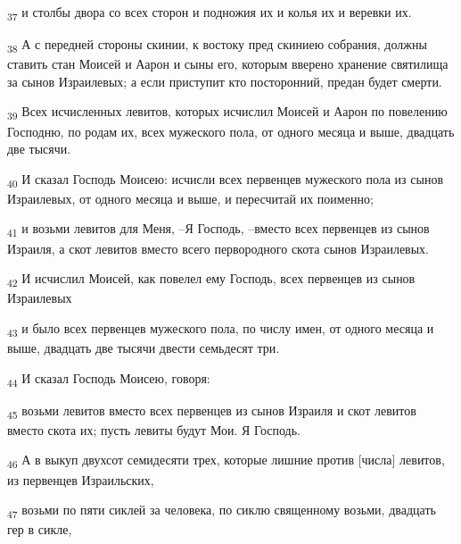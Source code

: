 \begin{tcolorbox}
\textsubscript{37} и столбы двора со всех сторон и подножия их и колья их и веревки их.
\end{tcolorbox}
\begin{tcolorbox}
\textsubscript{38} А с передней стороны скинии, к востоку пред скиниею собрания, должны ставить стан Моисей и Аарон и сыны его, которым вверено хранение святилища за сынов Израилевых; а если приступит кто посторонний, предан будет смерти.
\end{tcolorbox}
\begin{tcolorbox}
\textsubscript{39} Всех исчисленных левитов, которых исчислил Моисей и Аарон по повелению Господню, по родам их, всех мужеского пола, от одного месяца и выше, двадцать две тысячи.
\end{tcolorbox}
\begin{tcolorbox}
\textsubscript{40} И сказал Господь Моисею: исчисли всех первенцев мужеского пола из сынов Израилевых, от одного месяца и выше, и пересчитай их поименно;
\end{tcolorbox}
\begin{tcolorbox}
\textsubscript{41} и возьми левитов для Меня, --Я Господь, --вместо всех первенцев из сынов Израиля, а скот левитов вместо всего первородного скота сынов Израилевых.
\end{tcolorbox}
\begin{tcolorbox}
\textsubscript{42} И исчислил Моисей, как повелел ему Господь, всех первенцев из сынов Израилевых
\end{tcolorbox}
\begin{tcolorbox}
\textsubscript{43} и было всех первенцев мужеского пола, по числу имен, от одного месяца и выше, двадцать две тысячи двести семьдесят три.
\end{tcolorbox}
\begin{tcolorbox}
\textsubscript{44} И сказал Господь Моисею, говоря:
\end{tcolorbox}
\begin{tcolorbox}
\textsubscript{45} возьми левитов вместо всех первенцев из сынов Израиля и скот левитов вместо скота их; пусть левиты будут Мои. Я Господь.
\end{tcolorbox}
\begin{tcolorbox}
\textsubscript{46} А в выкуп двухсот семидесяти трех, которые лишние против [числа] левитов, из первенцев Израильских,
\end{tcolorbox}
\begin{tcolorbox}
\textsubscript{47} возьми по пяти сиклей за человека, по сиклю священному возьми, двадцать гер в сикле,
\end{tcolorbox}
